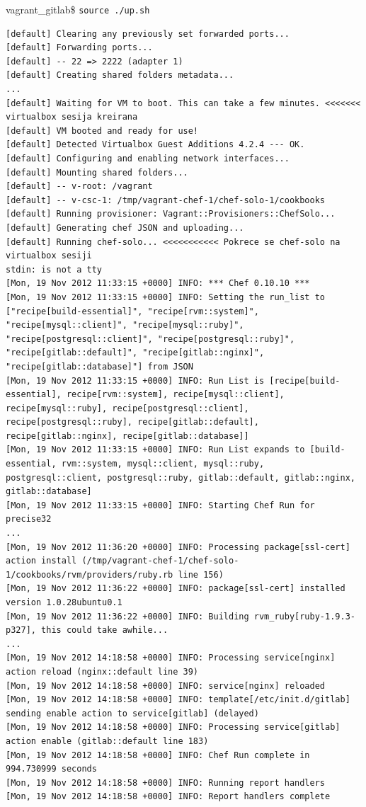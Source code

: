 \documentclass[times, utf8, seminar]{fit}
\begin{document}
vagrant\_gitlab\$ \verb+source ./up.sh+
\begin{lstlisting}
[default] Clearing any previously set forwarded ports...
[default] Forwarding ports...
[default] -- 22 => 2222 (adapter 1)
[default] Creating shared folders metadata...
...
[default] Waiting for VM to boot. This can take a few minutes. <<<<<<< virtualbox sesija kreirana
[default] VM booted and ready for use!
[default] Detected Virtualbox Guest Additions 4.2.4 --- OK.
[default] Configuring and enabling network interfaces...
[default] Mounting shared folders...
[default] -- v-root: /vagrant
[default] -- v-csc-1: /tmp/vagrant-chef-1/chef-solo-1/cookbooks
[default] Running provisioner: Vagrant::Provisioners::ChefSolo...
[default] Generating chef JSON and uploading...
[default] Running chef-solo... <<<<<<<<<<< Pokrece se chef-solo na virtualbox sesiji
stdin: is not a tty
[Mon, 19 Nov 2012 11:33:15 +0000] INFO: *** Chef 0.10.10 ***
[Mon, 19 Nov 2012 11:33:15 +0000] INFO: Setting the run_list to ["recipe[build-essential]", "recipe[rvm::system]", "recipe[mysql::client]", "recipe[mysql::ruby]", "recipe[postgresql::client]", "recipe[postgresql::ruby]", "recipe[gitlab::default]", "recipe[gitlab::nginx]", "recipe[gitlab::database]"] from JSON
[Mon, 19 Nov 2012 11:33:15 +0000] INFO: Run List is [recipe[build-essential], recipe[rvm::system], recipe[mysql::client], recipe[mysql::ruby], recipe[postgresql::client], recipe[postgresql::ruby], recipe[gitlab::default], recipe[gitlab::nginx], recipe[gitlab::database]]
[Mon, 19 Nov 2012 11:33:15 +0000] INFO: Run List expands to [build-essential, rvm::system, mysql::client, mysql::ruby, postgresql::client, postgresql::ruby, gitlab::default, gitlab::nginx, gitlab::database]
[Mon, 19 Nov 2012 11:33:15 +0000] INFO: Starting Chef Run for precise32
...
[Mon, 19 Nov 2012 11:36:20 +0000] INFO: Processing package[ssl-cert] action install (/tmp/vagrant-chef-1/chef-solo-1/cookbooks/rvm/providers/ruby.rb line 156)
[Mon, 19 Nov 2012 11:36:22 +0000] INFO: package[ssl-cert] installed version 1.0.28ubuntu0.1
[Mon, 19 Nov 2012 11:36:22 +0000] INFO: Building rvm_ruby[ruby-1.9.3-p327], this could take awhile...
...
[Mon, 19 Nov 2012 14:18:58 +0000] INFO: Processing service[nginx] action reload (nginx::default line 39)
[Mon, 19 Nov 2012 14:18:58 +0000] INFO: service[nginx] reloaded
[Mon, 19 Nov 2012 14:18:58 +0000] INFO: template[/etc/init.d/gitlab] sending enable action to service[gitlab] (delayed)
[Mon, 19 Nov 2012 14:18:58 +0000] INFO: Processing service[gitlab] action enable (gitlab::default line 183)
[Mon, 19 Nov 2012 14:18:58 +0000] INFO: Chef Run complete in 994.730999 seconds
[Mon, 19 Nov 2012 14:18:58 +0000] INFO: Running report handlers
[Mon, 19 Nov 2012 14:18:58 +0000] INFO: Report handlers complete
\end{lstlisting}
\end{document}
